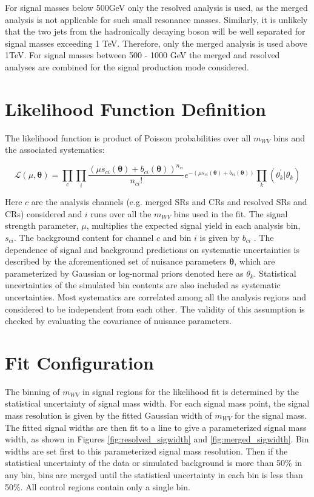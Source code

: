 For signal masses below 500GeV only the resolved analysis is used, as the merged analysis is not applicable for such small resonance masses. Similarly, it is unlikely that the two jets from the hadronically decaying boson will be well separated for signal masses exceeding 1 TeV. Therefore, only the merged analysis is used above 1TeV. For signal masses between 500 - 1000 GeV the merged and resolved analyses are combined for the signal production mode considered.

\section{Likelihood Function Definition}
The likelihood function is product of Poisson probabilities over all $m_{WV}$ bins and the associated systematics:

\begin{equation}
\mathcal{L}(\mu,\bm{\theta})= \prod_{c} \prod_{i} \frac{(\mu s_{ci}(\bm{\theta}) + b_{ci}(\bm{\theta}))^{n_{ci}}}{n_{ci}!} e^{-(\mu s_{ci}(\bm{\theta})+b_{ci}(\bm{\theta}))}\prod_{k}(\theta^{'}_{k}|\theta_{k})
\end{equation}

Here $c$ are the analysis channels (e.g. merged SRs and CRs and resolved SRs and CRs) considered and $i$ runs over all the $m_{WV}$ bins used in the fit. The signal strength parameter, $\mu$, multiplies the expected signal yield in each analysis bin, $s_{ci}$. The background content for channel $c$ and bin $i$ is given by $b_{ci}$ . The dependence of signal and background predictions on systematic uncertainties is described by the aforementioned set of nuisance parameters $\bm{\theta}$, which are parameterized by Gaussian or log-normal priors denoted here as $\theta_{k}$. Statistical uncertainties of the simulated bin contents are also included as systematic uncertainties. Most systematics are correlated among all the analysis regions and considered to be independent from each other. The validity of this assumption is checked by evaluating the covariance of nuisance parameters.  

\section{Fit Configuration}
The binning of $m_{WV}$ in signal regions for the likelihood fit is determined by the statistical uncertainty of signal mass width. For each signal mass point, the signal mass resolution is given by the fitted Gaussian width of $m_{WV}$ for the signal mass. The fitted signal widths are then fit to a line to give a parameterized signal mass width, as shown in Figures \ref{fig:resolved_sigwidth} and \ref{fig:merged_sigwidth}. Bin widths are set first to this parameterized signal mass resolution. Then if the statistical uncertainty of the data or simulated background is more than 50\% in any bin, bins are merged until the statistical uncertainty in each bin is less than 50\%. All control regions contain only a single bin.


